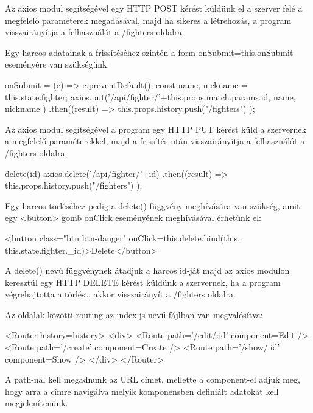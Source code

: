 Az axios modul segítségével egy HTTP POST kérést küldünk el a szerver felé a megfelelő paraméterek megadásával, majd ha sikeres a létrehozás, a program visszairányítja a felhasználót a /fighters oldalra.

Egy harcos adatainak a frissítéséhez szintén a form onSubmit={this.onSubmit} eseményére van szükségünk.

\begin{cpp}
onSubmit = (e) => {
    e.preventDefault();
    const { name, nickname } = this.state.fighter;
    axios.put('/api/fighter/'+this.props.match.params.id, { name, 
    nickname })
      .then((result) => {
        this.props.history.push("/fighters")
      });}
\end{cpp}

Az axios modul segítségével a program egy HTTP PUT kérést küld a szervernek a megfelelő paraméterekkel, majd a frissítés után visszairányítja a felhasználót a /fighters oldalra.

\begin{cpp}
delete(id){
    axios.delete('/api/fighter/'+id)
      .then((result) => {
        this.props.history.push("/fighters")
      });}
\end{cpp}

Egy harcos törléséhez pedig a delete() függvény meghívására van szükség, amit egy <button> gomb onClick eseményének meghívásával érhetünk el:

\begin{cpp}
<button class="btn btn-danger" onClick={this.delete.bind(this, 
this.state.fighter._id)}>Delete</button>
\end{cpp}

A delete() nevű függvénynek átadjuk a harcos id-ját majd az axios modulon keresztül egy HTTP DELETE kérést küldünk a szervernek, ha a program végrehajtotta a törlést, akkor visszairányít a /fighters oldalra.


Az oldalak közötti routing az index.js nevű fájlban van megvalósítva:

\begin{cpp}
<Router history={history}>
	<div>
		<Route path='/edit/:id' component={Edit} />
        <Route path='/create' component={Create} />
        <Route path='/show/:id' component={Show} />
	</div>
</Router>
\end{cpp}

A path-nál kell megadnunk az URL címet, mellette a component-el adjuk meg, hogy arra a címre navigálva melyik komponensben definiált adatokat kell megjelenítenünk.

